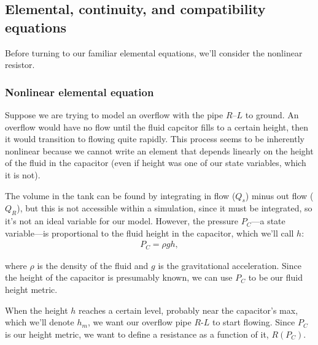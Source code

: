 \documentclass[dynamic_systems.tex]{subfiles}
\begin{document}
\subsection{Elemental, continuity, and compatibility equations}
\tags{}

Before turning to our familiar elemental equations, we'll consider the nonlinear resistor.

\subsubsection{Nonlinear elemental equation}
\tags{}

Suppose we are trying to model an overflow with the pipe $R$--$L$ to ground.
An overflow would have no flow until the fluid capcitor fills to a certain height, then it would transition to flowing quite rapidly.
This process seems to be inherently nonlinear because we cannot write an element that depends linearly on the height of the fluid in the capacitor (even if height was one of our state variables, which it is not).

The volume in the tank can be found by integrating in flow ($Q_s$) minus out flow ($Q_R$), but this is not accessible within a simulation, since it must be integrated, so it's not an ideal variable for our model.
However, the pressure $P_C$---a state variable---is proportional to the fluid height in the capacitor, which we'll call $h$:
\begin{align}
  P_C = \rho g h,
\end{align}

where $\rho$ is the density of the fluid and $g$ is the gravitational acceleration.
Since the height of the capacitor is presumably known, we can use $P_C$ to be our fluid height metric.
\tags{}

When the height $h$ reaches a certain level, probably near the capacitor's max, which we'll denote $h_m$, we want our overflow pipe $R$-$L$ to start flowing.
Since $P_C$ is our height metric, we want to define a resistance as a function of it, $R(P_C)$.
\end{document}
